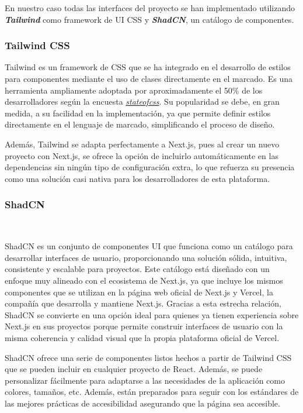En nuestro caso todas las interfaces del proyecto se han implementado utilizando \textbf{\textit{Tailwind}} como framework de UI CSS y \textbf{\textit{ShadCN}}, un catálogo de componentes.

\subsubsection{Tailwind CSS}

Tailwind es un framework de CSS que se ha integrado en el desarrollo de estilos para componentes mediante el uso de clases directamente en el marcado. Es una herramienta ampliamente adoptada por aproximadamente el 50\% de los desarrolladores según la encuesta \href{https://2023.stateofcss.com/es-ES/css-frameworks/}{\textit{stateofcss}}. Su popularidad se debe, en gran medida, a su facilidad en la implementación, ya que permite definir estilos directamente en el lenguaje de marcado, simplificando el proceso de diseño.

Además, Tailwind se adapta perfectamente a Next.js, pues al crear un nuevo proyecto con Next.js, se ofrece la opción de incluirlo automáticamente en las dependencias sin ningún tipo de configuración extra, lo que refuerza su presencia como una solución casi nativa para los desarrolladores de esta plataforma.

\subsubsection{ShadCN}~\label{subsec:shadcn}

ShadCN es un conjunto de componentes UI que funciona como un catálogo para desarrollar interfaces de usuario, proporcionando una solución sólida, intuitiva, consistente y escalable para proyectos. Este catálogo está diseñado con un enfoque muy alineado con el ecosistema de Next.js, ya que incluye los mismos componentes que se utilizan en la página web oficial de Next.js y Vercel, la compañía que desarrolla y mantiene Next.js. Gracias a esta estrecha relación, ShadCN se convierte en una opción ideal para quienes ya tienen experiencia sobre Next.js en sus proyectos porque permite construir interfaces de usuario con la misma coherencia y calidad visual que la propia plataforma oficial de Vercel.

ShadCN ofrece una serie de componentes listos hechos a partir de Tailwind CSS que se pueden incluir en cualquier proyecto de React. Además, se puede personalizar fácilmente para adaptarse a las necesidades de la aplicación como colores, tamaños, etc. Además, están preparados para seguir con los estándares de las mejores prácticas de accesibilidad asegurando que la página sea accesible.

